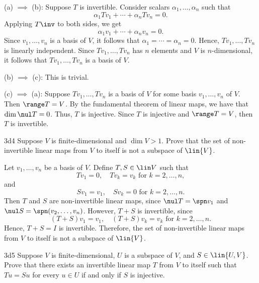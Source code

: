 \begin{solitem}
    \item (a) $\implies$ (b): Suppose $T$ is invertible.
	Consider scalars $\alpha_1, \ldots, \alpha_n$ such that
    \[
    	\alpha_1 Tv_1 + \cdots + \alpha_n Tv_n = 0.
    \]
    Applying $T\inv$ to both sides, we get
    \[
    	\alpha_1 v_1 + \cdots + \alpha_n v_n = 0.
    \]
    Since $v_1, \ldots, v_n$ is a basis of $V$, it follows that $\alpha_1 = \cdots = \alpha_n = 0$.
	Hence, $Tv_1, \ldots, Tv_n$ is linearly independent.
	Since $Tv_1, \ldots, Tv_n$ has $n$ elements and $V$ is $n$-dimensional, it follows that $Tv_1, \ldots, Tv_n$ is a basis of $V$.
    \item (b) $\implies$ (c): This is trivial.
    \item (c) $\implies$ (a): Suppose $Tv_1, \ldots, Tv_n$ is a basis of $V$ for some basis $v_1, \ldots, v_n$ of $V$.
	Then $\range T = V$.
	By the fundamental theorem of linear maps, we have that $\dim \nul T = 0$.
	Thus, $T$ is injective.
	Since $T$ is injective and $\range T = V$, then $T$ is invertible.
\end{solitem}

\begin{exercise}{3d4}
    Suppose $V$ is finite-dimensional and $\dim V > 1$.
	Prove that the set of non-invertible linear maps from $V$ to itself is not a subspace of $\lin{V}$.
\end{exercise}

\begin{sol}
    Let $v_1, \ldots, v_n$ be a basis of $V$.
	Define $T, S \in \lin V$ such that
    \[
    	Tv_1 = 0, \quad Tv_k = v_k \text{ for } k = 2, \ldots, n,
    \]
    and
    \[
    	Sv_1 = v_1, \quad Sv_k = 0 \text{ for } k = 2, \ldots, n.
    \]
    Then $T$ and $S$ are non-invertible linear maps, since $\nul T = \spn v_1$ and $\nul S = \spn(v_2, \ldots, v_n)$.
	However, $T + S$ is invertible, since
    \[
    	(T + S)v_1 = v_1, \quad (T + S)v_k = v_k \text{ for } k = 2, \ldots, n.
    \]
    Hence, $T + S = I$ is invertible.
	Therefore, the set of non-invertible linear maps from $V$ to itself is not a subspace of $\lin{V}$.
\end{sol}

\begin{exercise}{3d5}
    Suppose $V$ is finite-dimensional, $U$ is a subspace of $V$, and $S \in \lin{U, V}$.
	Prove that there exists an invertible linear map $T$ from $V$ to itself such that $Tu = Su$ for every $u \in U$ if and only if $S$ is injective.
\end{exercise}

